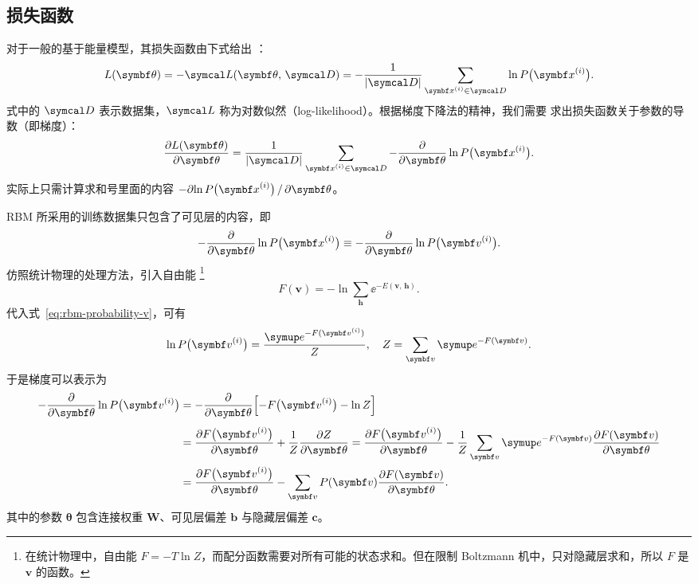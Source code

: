 \subsection{损失函数}

对于一般的基于能量模型，其损失函数由下式给出 \cite{rbmonline}：
\begin{equation}
  \label{eq:ebm-loss-function}
  L(\bm{\theta})
  = - \likeL(\bm{\theta},\,\domD)
  = - \frac{1}{\abs{\domD}} \sum_{\bm{x}^{(i)}\in\domD} \ln P\qty\big(\bm{x}^{(i)}).
\end{equation}
式中的 $\domD$ 表示数据集，$\likeL$ 称为对数似然（log-likelihood）。根据梯度下降法的精神，我们需要
求出损失函数关于参数的导数（即梯度）：
\begin{equation}
  \pdv{L(\bm{\theta})}{\bm{\theta}}
  = \frac{1}{\abs{\domD}} \sum_{\bm{x}^{(i)}\in\domD}
    - \pdv{\bm{\theta}} \ln P\qty\big(\bm{x}^{(i)}).
\end{equation}
实际上只需计算求和号里面的内容 $-\partial{\ln P\qty\big(\bm{x}^{(i)})}\,/\,\partial{\bm{\theta}}$。

RBM 所采用的训练数据集只包含了可见层的内容，即
\begin{equation}
  - \pdv{\bm{\theta}} \ln P\qty\big(\bm{x}^{(i)}) \equiv
  - \pdv{\bm{\theta}} \ln P\qty\big(\bm{v}^{(i)}).
\end{equation}
仿照统计物理的处理方法，引入自由能
\footnote{在统计物理中，自由能 $F=-T\ln Z$，而配分函数需要对所有可能的状态求和。但在限制
  Boltzmann 机中，只对隐藏层求和，所以 $F$ 是 $\bm{v}$ 的函数。} \cite{rbmonline}
\begin{equation}
  F(\bm{v}) = - \ln \sum_{\bm{h}} \ee^{-E(\bm{v},\,\bm{h})}.
\end{equation}
代入式~\eqref{eq:rbm-probability-v}，可有
\begin{equation}
  \ln P\qty\big(\bm{v}^{(i)}) = \frac{\ee^{-F(\bm{v}^{(i)})}}{Z} \qc
  Z = \sum_{\bm{v}} \ee^{-F(\bm{v})}.
\end{equation}
于是梯度可以表示为
\begin{align}
  \label{eq:rmb-gradient}
     - \pdv{\bm{\theta}} \ln P\qty\big(\bm{v}^{(i)})
  &= - \pdv{\bm{\theta}} \qty\Big[-F\qty\big(\bm{v}^{(i)}) - \ln Z]
     \vphantom{\sum_x} \notag \\
  &= \pdv{F\qty\big(\bm{v}^{(i)})}{\bm{\theta}} + \frac{1}{Z} \pdv{Z}{\bm{\theta}}
   = \pdv{F\qty\big(\bm{v}^{(i)})}{\bm{\theta}}
     - \frac{1}{Z} \sum_{\bm{v}} \ee^{-F(\bm{v})} \pdv{F(\bm{v})}{\bm{\theta}} \notag \\
  &= \pdv{F\qty\big(\bm{v}^{(i)})}{\bm{\theta}}
     - \sum_{\bm{v}} P(\bm{v}) \pdv{F(\bm{v})}{\bm{\theta}}.
\end{align}
其中的参数 $\bm{\theta}$ 包含连接权重 $\bm{W}$、可见层偏差 $\bm{b}$ 与隐藏层偏差 $\bm{c}$。

